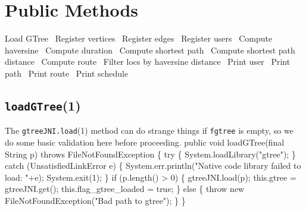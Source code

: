 \documentclass{article}
\def\nwendcode{\endtrivlist \endgroup}      %
\let\nwdocspar=\par
\begin{document}
\section{Public Methods}
\nwenddocs{}\endmoddef{}
  \LA{}Load GTree~{\nwtagstyle{}}\RA{}
  \LA{}Register vertices~{\nwtagstyle{}}\RA{}
  \LA{}Register edges~{\nwtagstyle{}}\RA{}
  \LA{}Register users~{\nwtagstyle{}}\RA{}
  \LA{}Compute haversine~{\nwtagstyle{}}\RA{}
  \LA{}Compute duration~{\nwtagstyle{}}\RA{}
  \LA{}Compute shortest path~{\nwtagstyle{}}\RA{}
  \LA{}Compute shortest path distance~{\nwtagstyle{}}\RA{}
  \LA{}Compute route~{\nwtagstyle{}}\RA{}
  \LA{}Filter locs by haversine distance~{\nwtagstyle{}}\RA{}
  \LA{}Print user~{\nwtagstyle{}}\RA{}
  \LA{}Print path~{\nwtagstyle{}}\RA{}
  \LA{}Print route~{\nwtagstyle{}}\RA{}
  \LA{}Print schedule~{\nwtagstyle{}}\RA{}
\nwendcode{}\nwdocspar

\subsection{{\tt{}\protect{}\protect{}loadGTree}(1)}
The {\tt{}gtreeJNI.load}(1) method can do strange things if {\tt{}f{}gtree} is empty,
so we do some basic validation here before proceeding.
\nwenddocs{}\endmoddef{}
public void loadGTree(final String p) throws FileNotFoundException \{
  try \{
    System.loadLibrary("gtree");
  \} catch (UnsatisfiedLinkError e) \{
    System.err.println("Native code library failed to load: "+e);
    System.exit(1);
  \}
  if (p.length() > 0) \{
    gtreeJNI.load(p);
    this.gtree = gtreeJNI.get();
    this.flag_gtree_loaded = true;
  \} else \{
    throw new FileNotFoundException("Bad path to gtree");
  \}
\}
\eatline
{}\nwendcode{}\nwdocspar
\end{document}
